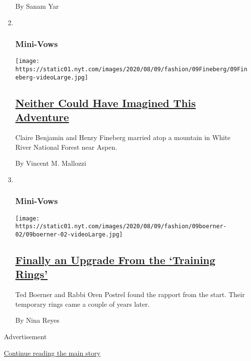 \begin{enumerate}
  By Sanam Yar
\item ~
  \hypertarget{mini-vows}{%
  \subsubsection{Mini-Vows}\label{mini-vows}}

  \texttt{[image: https://static01.nyt.com/images/2020/08/09/fashion/09Fineberg/09Fineberg-videoLarge.jpg]}

  \hypertarget{neither-could-have-imagined-this-adventure}{%
  \subsection{\texorpdfstring{\href{/2020/08/07/fashion/weddings/neither-could-have-imagined-this-adventure.html}{Neither
  Could Have Imagined This
  Adventure}}{Neither Could Have Imagined This Adventure}}\label{neither-could-have-imagined-this-adventure}}

  Claire Benjamin and Henry Fineberg married atop a mountain in White
  River National Forest near Aspen.

  By Vincent M. Mallozzi
\item ~
  \hypertarget{mini-vows-1}{%
  \subsubsection{Mini-Vows}\label{mini-vows-1}}

  \texttt{[image: https://static01.nyt.com/images/2020/08/09/fashion/09boerner-02/09boerner-02-videoLarge.jpg]}

  \hypertarget{finally-an-upgrade-from-the-training-rings}{%
  \subsection{\texorpdfstring{\href{/2020/08/07/fashion/weddings/finally-an-upgrade-from-the-training-rings.html}{Finally
  an Upgrade From the `Training
  Rings'}}{Finally an Upgrade From the `Training Rings'}}\label{finally-an-upgrade-from-the-training-rings}}

  Ted Boerner and Rabbi Oren Postrel found the rapport from the start.
  Their temporary rings came a couple of years later.

  By Nina Reyes
\end{enumerate}

Advertisement

\protect\hyperlink{after-mid1}{Continue reading the main story}

